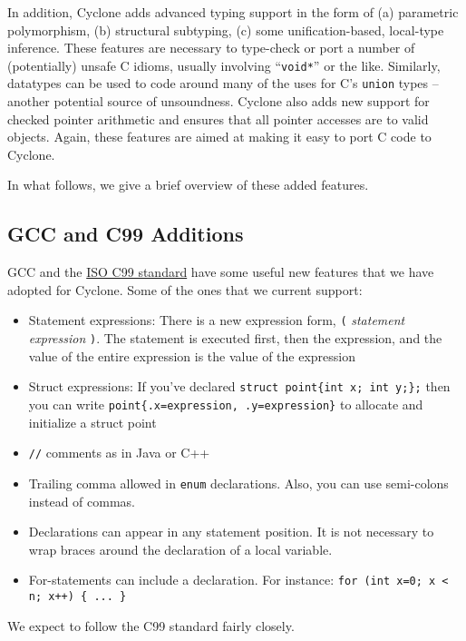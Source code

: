 In addition, Cyclone adds advanced typing support in the form of (a)
parametric polymorphism, (b) structural subtyping, (c) some
unification-based, local-type inference.  These features are necessary
to type-check or port a number of (potentially) unsafe C idioms,
usually involving ``\texttt{void*}'' or the like.  Similarly, datatypes
can be used to code around many of the uses for C's \texttt{union} types
-- another potential source of unsoundness.  Cyclone also adds new
support for checked pointer arithmetic and ensures that all pointer
accesses are to valid objects.  Again, these features are aimed at
making it easy to port C code to Cyclone.

In what follows, we give a brief overview of these added features.

\subsection{GCC and C99 Additions}

GCC and the
\href{http://web.onetelnet.ch/~twolf/tw/c/c9x_changes.html}{ISO C99
  standard} have some useful new features that we have adopted for
Cyclone. Some of the ones that we current support:
\begin{itemize}
\item Statement expressions: There is a new expression form,
  \texttt{(\lb} \textit{statement} \textit{expression} \texttt{\rb)}.
  The statement is executed first, then the expression, and the value
  of the entire expression is the value of the expression
\item Struct expressions:  If you've declared
  \verb|struct point{int x; int y;};| then you can write
  \verb|point{.x=expression, .y=expression}| to allocate and
  initialize a struct point
\item \texttt{//} comments as in Java or C++
\item Trailing comma allowed in \texttt{enum} declarations.  Also, you
  can use semi-colons instead of commas.
\item Declarations can appear in any statement position.  It is not
  necessary to wrap braces around the declaration of a local variable.
\item For-statements can include a declaration. For instance:
  \verb|for (int x=0; x < n; x++) { ... }|
\end{itemize}

We expect to follow the C99 standard fairly closely.


